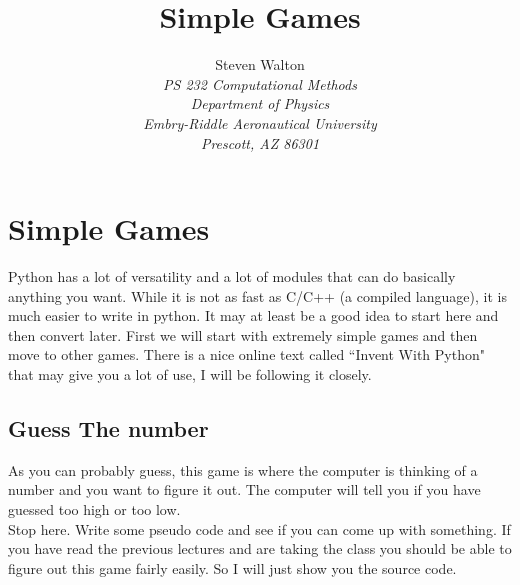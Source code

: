 \documentclass[11pt]{article}   %
\title{Simple Games}
\author{Steven Walton\\     %
\textit{PS 232 Computational Methods}\\
\textit{Department of Physics}\\
\textit{Embry-Riddle Aeronautical University}\\
\textit{Prescott, AZ   86301}}
\begin{document}
\maketitle
\section*{Simple Games}
Python has a lot of versatility and a lot of modules that can do basically anything you want.  While it is not as fast as C/C++ (a compiled language), it is much easier to write in python.  It may at least be a good idea to 
start here and then convert later.  First we will start with extremely simple games and then move to other games.  There is a nice online text called ``Invent With Python" that may give you a lot of use, I will be following it
closely.

\subsection*{Guess The number}
As you can probably guess, this game is where the computer is thinking of a number and you want to figure it out.  The computer will tell you if you have guessed too high or too low.
\\
Stop here.  Write some pseudo code and see if you can come up with something.  If you have read the previous lectures and are taking the class you should be able to figure out this game fairly easily.  So I will just show you the 
source code.
\end{document}
